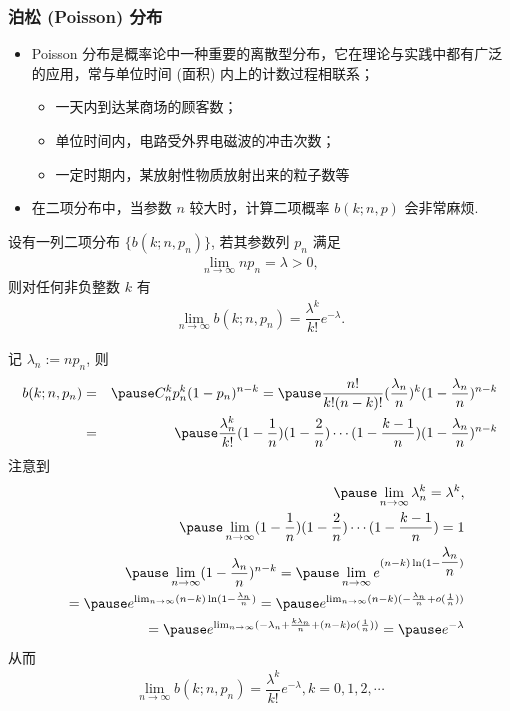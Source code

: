 \documentclass[Prob-All.tex]{subfiles}
\begin{document}
\begin{frame}
	\frametitle{泊松 (Poisson) 分布}
	\begin{itemize}[<+-|alert@+>]
		\item Poisson 分布是概率论中一种重要的离散型分布，它在理论与实践中都有广泛的应用，常与单位时间 (面积) 内上的计数过程相联系；
		      \begin{itemize}
			      \item 一天内到达某商场的顾客数；
			      \item 单位时间内，电路受外界电磁波的冲击次数；
			      \item 一定时期内，某放射性物质放射出来的粒子数等
		      \end{itemize}
		\item 在二项分布中，当参数 $n$ 较大时，计算二项概率 $b (k;n,p)$ 会非常麻烦.
	\end{itemize}
	\pause  \begin{thm}
		设有一列二项分布 $\{b (k;n,p_n)\}$, 若其参数列 $p_n$ 满足
		\begin{eqnarray*}
			\lim_{n\rightarrow \infty}np_n=\lambda>0,
		\end{eqnarray*}
		则对任何非负整数 $k$ 有
		\begin{eqnarray*}
			\lim_{n\rightarrow \infty}b(k;n,p_n)=\dfrac{\lambda^k}{k!}e^{-\lambda}.
		\end{eqnarray*}
	\end{thm}
\end{frame}
\begin{frame}

	\vspace{0.4cm}
	\zheng 记 $\lambda_n:=np_n$, 则
	\begin{eqnarray*}
		b(k;n,p_n)&=&\pause C_n^kp_n^k(1-p_n)^{n-k}=\pause \dfrac{n!}{k!(n-k)!}(\dfrac{\lambda_n}{n})^k(1-\dfrac{\lambda_n}{n})^{n-k}\\
		&=&\pause \dfrac{\lambda_n^k}{k!}(1-\dfrac{1}{n})(1-\dfrac{2}{n})\cdots(1-\dfrac{k-1}{n})(1-\dfrac{\lambda_n}{n})^{n-k}
	\end{eqnarray*}
	\pause 注意到
	\begin{eqnarray*}
		&&\pause \lim_{n\rightarrow\infty}\lambda_n^k=\lambda^k, \\
		&&\pause \lim_{n\rightarrow\infty}(1-\dfrac{1}{n})(1-\dfrac{2}{n})\cdots(1-\dfrac{k-1}{n})=1\\
		&&\pause \lim_{n\rightarrow\infty}(1-\dfrac{\lambda_n}{n})^{n-k}=\pause \lim_{n\rightarrow\infty}e^{(n-k)\ln(1-\dfrac{\lambda_n}{n})}\\
		&&=\pause e^{\lim_{n\rightarrow\infty}(n-k)\ln(1-\frac{\lambda_n}{n})}=\pause e^{\lim_{n\rightarrow\infty}(n-k)(-\frac{\lambda_n}{n}+o(\frac{1}{n}))}\\
		&&=\pause e^{\lim_{n\rightarrow\infty}(-\lambda_n+\frac{k\lambda_n}{n}+(n-k)o(\frac{1}{n}))}=\pause e^{-\lambda}
	\end{eqnarray*}
	\pause 从而 \vspace{-0.8cm}
	\begin{eqnarray*}
		\lim_{n\rightarrow\infty}b(k;n,p_n)=\dfrac{\lambda^k}{k!}e^{-\lambda}, k=0, 1, 2,\cdots
	\end{eqnarray*}

\end{frame}
\end{document}
